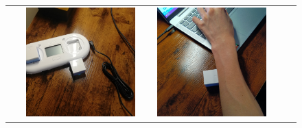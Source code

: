 \documentclass[paper=a4paper,jafontsize=9pt,head_space=15mm,gutter=20mm,
twocolumn,number_of_lines=49, line_length=26zw]{myuarticle}
\begin{document}
\begin{figure}[t]
\begin{tabular}{|c|c|c|c|c|}
\begin{minipage}[c]{0.15\textwidth}
    \end{minipage}     &
    \begin{minipage}[c]{0.15\textwidth}
      \centering
      \includegraphics[width=0.9\textwidth]{resources/doc_after.jpg}
    \end{minipage}     &
    \begin{minipage}[c]{0.15\textwidth}
      \centering
      \includegraphics[width=0.9\textwidth]{resources/pet_after.jpg}

\end{minipage}
\end{tabular}
\end{figure}
\end{document}
